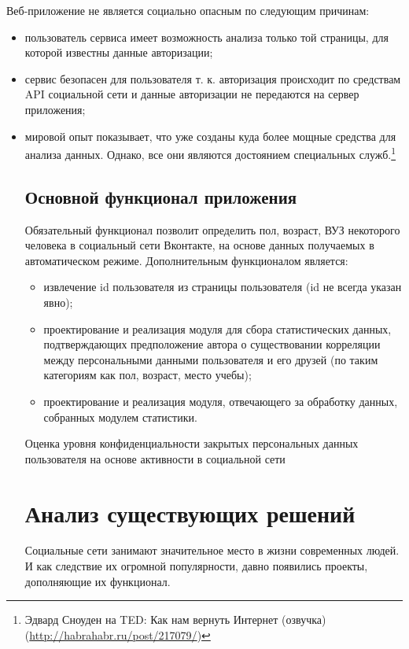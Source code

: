 Веб-приложение не является социально опасным по следующим причинам:
\begin{itemize}
\item пользователь сервиса имеет возможность анализа только той страницы, для которой известны данные авторизации;
\item сервис безопасен для пользователя т. к. авторизация происходит по средствам  API  социальной сети и данные авторизации не передаются на сервер приложения; 
\item мировой опыт показывает, что уже созданы куда более мощные средства для анализа данных. Однако, все они являются достоянием специальных служб.\footnote{Эдвард Сноуден на TED: Как нам вернуть Интернет (озвучка) (\url{http://habrahabr.ru/post/217079/})}
\\

\subsection{Основной функционал приложения}
Обязательный функционал позволит определить пол, возраст, ВУЗ некоторого человека в социальный сети Вконтакте, на основе данных получаемых в автоматическом режиме. Дополнительным функционалом является:
	\begin{itemize}
	\item извлечение id пользователя из страницы пользователя (id не всегда указан явно);
	\item проектирование и реализация модуля для сбора статистических данных, подтверждающих предположение автора о существовании корреляции между персональными данными пользователя и его друзей (по таким категориям как пол, возраст, место учебы);
	\item проектирование и реализация модуля, отвечающего за обработку данных, собранных модулем статистики.

	\end{itemize}

Оценка уровня конфиденциальности закрытых персональных данных пользователя на основе активности в социальной сети
	
\section{Анализ существующих решений}
 Социальные сети занимают значительное место в жизни современных людей. И как следствие их огромной популярности, давно появились проекты, дополняющие их функционал. 
 \\
 

\end{itemize}
